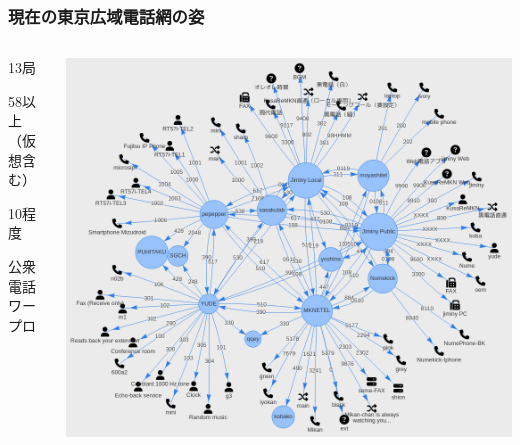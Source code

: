 \documentclass[
  lualatex,
  aspectratio=169,
  14pt
]{beamer}
\begin{document}
\begin{frame}
  \frametitle{現在の東京広域電話網の姿}

  \begin{columns}
    \begin{column}{.25\textwidth}
      \begin{description}[labelwidth=\linewidth]
        \item[交換局数]
          13局
        \item[端末数]
          58以上\\
          （仮想含む）
        \item[うち黒電話]
          10程度
        \item[その他]
          公衆電話\\
          ワープロ
      \end{description}
    \end{column}
    \begin{column}{.7\textwidth}
      \centering
      \includegraphics[height=.87\textheight]{./images/mantela.png}
    \end{column}
  \end{columns}
\end{frame}
\end{document}
